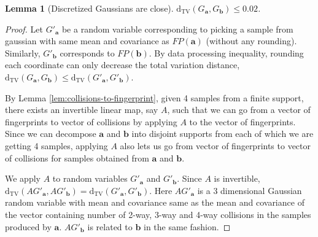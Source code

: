 \documentclass[10pt]{article} %
\theoremstyle{plain}
\newtheorem{lemma}[theorem]{Lemma}
\newcommand{\dtv}{\mathrm{d_{TV}}}
\newcommand{\ba}{\textbf{a}}
\newcommand{\bb}{\textbf{b}}
\begin{document}
\begin{lemma}[Discretized Gaussians are close]
	\label{lem:tv_g_g}
	$\dtv(G_\ba, G_\bb) \leq 0.02$.
\end{lemma}
\begin{proof}
	Let $G'_\ba$ be a random variable corresponding to picking a sample from gaussian with same mean and covariance as  $FP(\ba)$ (without any rounding). Similarly, $G'_\bb$ corresponds to $FP(\bb)$. By data processing inequality, rounding each coordinate can only decrease the total variation distance, $\dtv(G_\ba, G_\bb) \leq \dtv(G'_\ba, G'_\bb)$.
	
	By  Lemma \ref{lem:collisions-to-fingerprint}, given 4 samples from a finite support, there exists an invertible linear map, say $A$, such that we can go from a vector of fingerprints to vector of collisions by applying $A$ to the vector of fingerprints. Since we can decompose $\ba$ and $\bb$ into disjoint supports from each of which we are getting 4 samples, applying $A$ also lets us go from vector of fingerprints to vector of collisions for samples obtained from $\ba$ and $\bb$. 
	
	We apply $A$ to random variables $G'_\ba$ and $G'_\bb$.
	Since $A$ is invertible, $\dtv(AG'_\ba, AG'_\bb) = \dtv(G'_\ba, G'_\bb)$. Here $AG'_\ba$ is a 3 dimensional Gaussian random variable with mean and covariance same as the mean and covariance of the vector containing number of 2-way, 3-way and 4-way collisions in the samples produced by $\ba$. $AG'_\bb$ is related to $\bb$ in the same fashion. 
	

\end{proof}
\end{document}
